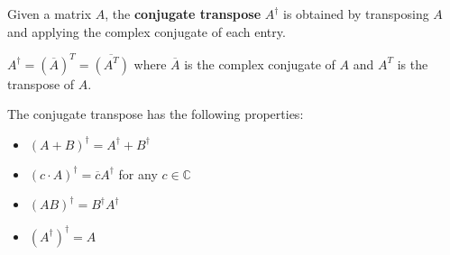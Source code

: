 \begin{defn}
    Given a matrix $A$, the \textbf{conjugate transpose} $A^\dagger$ is obtained by transposing $A$ and applying the complex conjugate of each entry.

    $A^\dagger = (\overline{A})^T = \overline{(A^T)}$ where $\overline{A}$ is the complex conjugate of $A$ and $A^T$ is the transpose of $A$.
\end{defn}

\begin{result}
    The conjugate transpose has the following properties:
    \begin{itemize}
        \item $(A + B)^\dagger = A^\dagger + B^\dagger$
        \item $(c \cdot A)^\dagger = \overline{c} A^\dagger$ for any $c \in \mathbb{C}$
        \item $(AB)^\dagger = B^\dagger A^\dagger$
        \item $(A^\dagger)^\dagger = A$
    \end{itemize}
\end{result}


